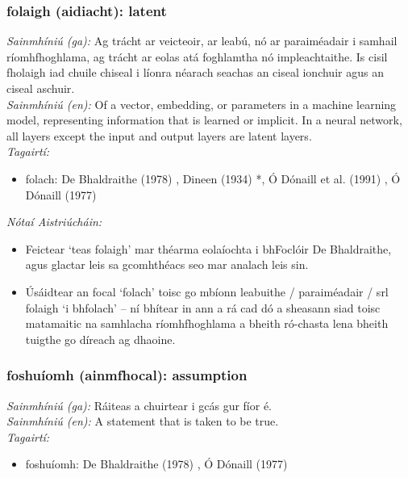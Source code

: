 \subsubsection*{folaigh (aidiacht): latent}
 \noindent \textit{Sainmhíniú (ga):} Ag trácht ar veicteoir, ar leabú, nó ar paraiméadair i samhail ríomhfhoghlama, ag trácht ar eolas atá foghlamtha nó impleachtaithe. Is cisil fholaigh iad chuile chiseal i líonra néarach seachas an ciseal ionchuir agus an ciseal aschuir.
\\
 \noindent \textit{Sainmhíniú (en):} Of a vector, embedding, or parameters in a machine learning model, representing information that is learned or implicit. In a neural network, all layers except the input and output layers are latent layers.
\\
 \noindent \textit{Tagairtí:}
\begin{itemize}
	\item folach: De Bhaldraithe (1978) \cite{de-bhaldraithe}, Dineen (1934) \cite{dineen}*, Ó Dónaill et al. (1991) \cite{focloir-beag}, Ó Dónaill (1977) \cite{odonaill}
\end{itemize}

 \noindent \textit{Nótaí Aistriúcháin:}
\begin{itemize}
	\item Feictear `teas folaigh' mar théarma eolaíochta i bhFoclóir De Bhaldraithe, agus glactar leis sa gcomhthéacs seo mar analach leis sin.
	\item Úsáidtear an focal `folach' toisc go mbíonn leabuithe / paraiméadair / srl folaigh `i bhfolach' -- ní bhítear in ann a rá cad dó a sheasann siad toisc matamaitic na samhlacha ríomhfhoghlama a bheith ró-chasta lena bheith tuigthe go díreach ag dhaoine.
\end{itemize}


\subsubsection*{foshuíomh (ainmfhocal): assumption}
 \noindent \textit{Sainmhíniú (ga):} Ráiteas a chuirtear i gcás gur fíor é.
\\
 \noindent \textit{Sainmhíniú (en):} A statement that is taken to be true.
\\
 \noindent \textit{Tagairtí:}
\begin{itemize}
	\item foshuíomh: De Bhaldraithe (1978) \cite{de-bhaldraithe}, Ó Dónaill (1977) \cite{odonaill}
\end{itemize}

